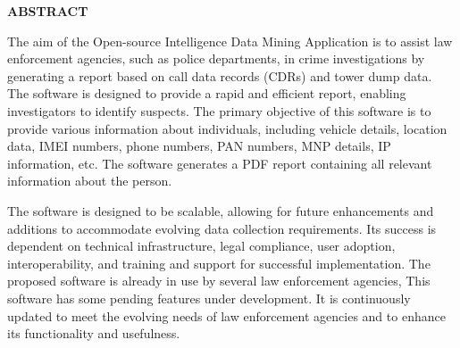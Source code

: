 \thispagestyle{plain}
\begin{center}
    \Large \textbf{\uppercase{Abstract}}
\end{center}

\vspace{3\baselineskip}

\vspace{1ex}
\justify

The aim of the Open-source Intelligence Data Mining Application is to assist law enforcement agencies, such as police departments, in crime investigations by generating a report based on call data records (CDRs) and tower dump data. The software is designed to provide a rapid and efficient report, enabling investigators to identify suspects.
The primary objective of this software is to provide various information about individuals, including vehicle details, location data, IMEI numbers, phone numbers, PAN numbers, MNP details, IP information, etc. The software generates a PDF report containing all relevant information about the person.

The software is designed to be scalable, allowing for future enhancements and additions to accommodate evolving data collection requirements. Its success is dependent on technical infrastructure, legal compliance, user adoption, interoperability, and training and support for successful implementation.
The proposed software is already in use by several law enforcement agencies, This software has some pending features under development. It is continuously updated to meet the evolving needs of law enforcement agencies and to enhance its functionality and usefulness.